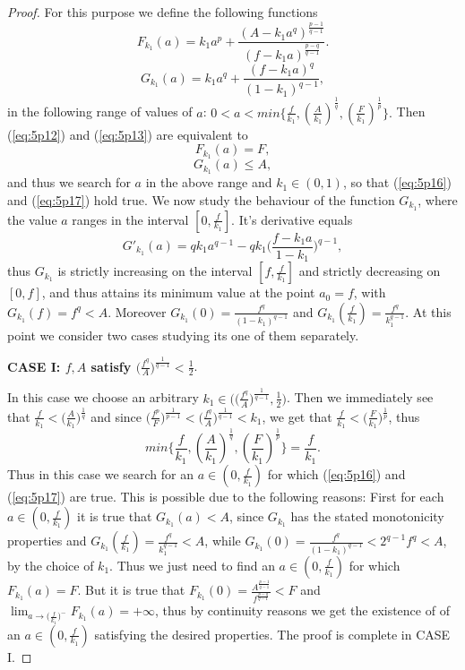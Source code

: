 \documentclass{article}
\numberwithin{equation}{section}
\theoremstyle{definition}
\theoremstyle{remark}
\begin{document}
\begin{proof}
For this purpose we define the following functions
\begin{equation}\label{eq:5p14}
F_{k_1}(a)=k_1a^p+\frac{(A-k_1a^q)^\frac{p-1}{q-1}}{(f-k_1a)^\frac{p-q}{q-1}}.
\end{equation}
\begin{equation}\label{eq:5p15}
G_{k_1}(a)=k_1a^q+\frac{(f-k_1a)^q}{(1-k_1)^{q-1}},
\end{equation}
in the following range of values of $a$:
$0<a<min\{ \frac{f}{k_1},(\frac{A}{k_1})^{\frac{1}{q}}, (\frac{F}{k_1})^{\frac{1}{p}} \}.$
Then (\ref{eq:5p12}) and (\ref{eq:5p13}) are equivalent to
\begin{equation}\label{eq:5p16}
F_{k_1}(a)=F,
\end{equation}
\begin{equation}\label{eq:5p17}
G_{k_1}(a)\leq A,
\end{equation}
and thus we search for $a$ in the above range and $k_1 \in (0,1)$, so that (\ref{eq:5p16}) and (\ref{eq:5p17}) hold true.
We now study the behaviour of the function $G_{k_1}$, where the value $a$ ranges in the interval $[0,\frac{f}{k_1}]$. It's derivative equals
$$G'_{k_1}(a)=qk_1a^{q-1}-qk_1\big(\frac{f-k_1a}{1-k_1} \big)^{q-1},$$
thus $G_{k_1}$ is strictly increasing on the interval $[f,\frac{f}{k_1}]$ and strictly decreasing on $[0,f]$, and thus attains its minimum value at the point $a_0=f$, with $G_{k_1}(f)=f^q<A$. Moreover $G_{k_1}(0)=\frac{f^q}{(1-k_1)^{q-1}}$ and $G_{k_1}(\frac{f}{k_1})=\frac{f^q}{k_1^{q-1}}$.
At this point we consider two cases studying its one of them separately.

{\bf{CASE I}: $f,A$ satisfy $\big(\frac{f^q}{A}\big)^{\frac{1}{q-1}}<\frac{1}{2}$}.

In this case we choose an arbitrary $k_1 \in \big(\big(\frac{f^q}{A}\big)^{\frac{1}{q-1}}, \frac{1}{2} \big)$. Then we immediately see that 
$\frac{f}{k_1}<\big(\frac{A}{k_1}\big)^{\frac{1}{q}}$ and since
$\big(\frac{f^p}{F}\big)^{\frac{1}{p-1}}<\big(\frac{f^q}{A}\big)^{\frac{1}{q-1}}<k_1$, we get that $\frac{f}{k_1}<\big(\frac{F}{k_1}\big)^{\frac{1}{p}}$, thus 
$$min\{ \frac{f}{k_1},(\frac{A}{k_1})^{\frac{1}{q}}, (\frac{F}{k_1})^{\frac{1}{p}} \}=\frac{f}{k_1}.$$
Thus in this case we search for an $a\in (0, \frac{f}{k_1})$ for which
(\ref{eq:5p16}) and (\ref{eq:5p17}) are true. This is possible due to the following reasons: First for each $a\in (0, \frac{f}{k_1})$ it is true that $G_{k_1}(a)<A$, since $G_{k_1}$ has the stated monotonicity properties and $G_{k_1}(\frac{f}{k_1})=\frac{f^q}{k_1^{q-1}}<A$, while
$G_{k_1}(0)=\frac{f^q}{(1-k_1)^{q-1}}<2^{q-1}f^q<A$, by the choice of $k_1$. Thus we just need to find an $a\in (0, \frac{f}{k_1})$ for which 
$F_{k_1}(a)=F$. But it is true that $F_{k_1}(0)= \frac{A^{\frac{p-1}{q-1}}}{f^{\frac{p-q}{q-1}}}<F$ and $\lim_{a\rightarrow\big(\frac{f}{k_1}\big)^-}F_{k_1}(a)=+\infty$, thus by continuity reasons we get the existence of of an $a\in (0, \frac{f}{k_1})$ satisfying the desired properties. The proof is complete in CASE I.


\end{proof}
\end{document}
